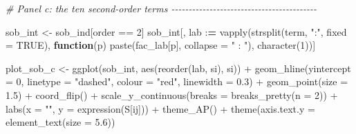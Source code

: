 \documentclass[
  11pt,
]{article}
\newenvironment{Shaded}{\begin{snugshade}}{\end{snugshade}}
\newcommand{\AttributeTok}[1]{\textcolor[rgb]{0.77,0.63,0.00}{#1}}
\newcommand{\CommentTok}[1]{\textcolor[rgb]{0.56,0.35,0.01}{\textit{#1}}}
\newcommand{\ConstantTok}[1]{\textcolor[rgb]{0.00,0.00,0.00}{#1}}
\newcommand{\ControlFlowTok}[1]{\textcolor[rgb]{0.13,0.29,0.53}{\textbf{#1}}}
\newcommand{\DecValTok}[1]{\textcolor[rgb]{0.00,0.00,0.81}{#1}}
\newcommand{\ErrorTok}[1]{\textcolor[rgb]{0.64,0.00,0.00}{\textbf{#1}}}
\newcommand{\FloatTok}[1]{\textcolor[rgb]{0.00,0.00,0.81}{#1}}
\newcommand{\FunctionTok}[1]{\textcolor[rgb]{0.00,0.00,0.00}{#1}}
\newcommand{\NormalTok}[1]{#1}
\newcommand{\OtherTok}[1]{\textcolor[rgb]{0.56,0.35,0.01}{#1}}
\newcommand{\SpecialCharTok}[1]{\textcolor[rgb]{0.00,0.00,0.00}{#1}}
\newcommand{\StringTok}[1]{\textcolor[rgb]{0.31,0.60,0.02}{#1}}
\begin{document}
\begin{Shaded}
\begin{Highlighting}[]
\CommentTok{\# Panel c: the ten second{-}order terms {-}{-}{-}{-}{-}{-}{-}{-}{-}{-}{-}{-}{-}{-}{-}{-}{-}{-}{-}{-}{-}{-}{-}{-}{-}{-}{-}{-}{-}{-}{-}{-}{-}{-}{-}{-}{-}{-}{-}{-}{-}{-}}

\NormalTok{sob\_int }\OtherTok{\textless{}{-}}\NormalTok{ sob\_ind[order }\SpecialCharTok{==} \DecValTok{2}\NormalTok{]}
\NormalTok{sob\_int[, lab }\SpecialCharTok{:}\ErrorTok{=} \FunctionTok{vapply}\NormalTok{(}\FunctionTok{strsplit}\NormalTok{(term, }\StringTok{":"}\NormalTok{, }\AttributeTok{fixed =} \ConstantTok{TRUE}\NormalTok{), }\ControlFlowTok{function}\NormalTok{(p)}
  \FunctionTok{paste}\NormalTok{(fac\_lab[p], }\AttributeTok{collapse =} \StringTok{" : "}\NormalTok{), }\FunctionTok{character}\NormalTok{(}\DecValTok{1}\NormalTok{))]}

\NormalTok{plot\_sob\_c }\OtherTok{\textless{}{-}} \FunctionTok{ggplot}\NormalTok{(sob\_int, }\FunctionTok{aes}\NormalTok{(}\FunctionTok{reorder}\NormalTok{(lab, si), si)) }\SpecialCharTok{+}
  \FunctionTok{geom\_hline}\NormalTok{(}\AttributeTok{yintercept =} \DecValTok{0}\NormalTok{, }\AttributeTok{linetype =} \StringTok{"dashed"}\NormalTok{, }\AttributeTok{colour =} \StringTok{"red"}\NormalTok{,}
             \AttributeTok{linewidth =} \FloatTok{0.3}\NormalTok{) }\SpecialCharTok{+}
  \FunctionTok{geom\_point}\NormalTok{(}\AttributeTok{size =} \FloatTok{1.5}\NormalTok{) }\SpecialCharTok{+}
  \FunctionTok{coord\_flip}\NormalTok{() }\SpecialCharTok{+}
  \FunctionTok{scale\_y\_continuous}\NormalTok{(}\AttributeTok{breaks =} \FunctionTok{breaks\_pretty}\NormalTok{(}\AttributeTok{n =} \DecValTok{2}\NormalTok{)) }\SpecialCharTok{+}
  \FunctionTok{labs}\NormalTok{(}\AttributeTok{x =} \StringTok{""}\NormalTok{, }\AttributeTok{y =} \FunctionTok{expression}\NormalTok{(S[ij])) }\SpecialCharTok{+}
  \FunctionTok{theme\_AP}\NormalTok{() }\SpecialCharTok{+}
  \FunctionTok{theme}\NormalTok{(}\AttributeTok{axis.text.y =} \FunctionTok{element\_text}\NormalTok{(}\AttributeTok{size =} \FloatTok{5.6}\NormalTok{))}
\end{Highlighting}
\end{Shaded}
\end{document}
